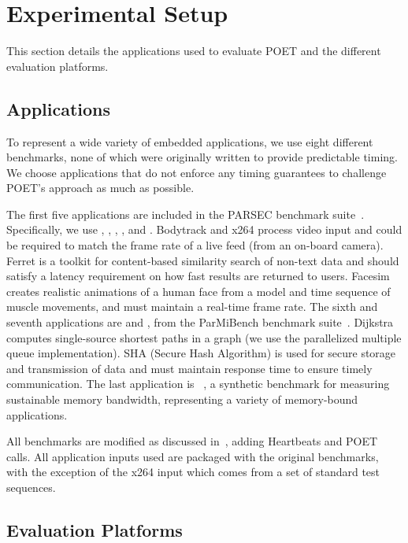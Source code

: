\section{Experimental Setup}
\label{sec:poet-usage}

This section details the applications used to evaluate POET and the different evaluation platforms.


\subsection{Applications}

To represent a wide variety of embedded applications, we use eight different benchmarks, none of which were originally written to provide predictable timing.
We choose applications that do not enforce any timing guarantees to challenge POET's approach as much as possible.

The first five applications are included in the PARSEC benchmark suite~\cite{parsec}.
Specifically, we use , , , , and .
Bodytrack and x264 process video input and could be required to match the frame rate of a live feed (\eg from an on-board camera).
Ferret is a toolkit for content-based similarity search of non-text data and should satisfy a latency requirement on how fast results are returned to users.
Facesim creates realistic animations of a human face from a model and time sequence of muscle movements, and must maintain a real-time frame rate.
The sixth and seventh applications are  and , from the ParMiBench benchmark suite~\cite{parmibench}.
Dijkstra computes single-source shortest paths in a graph (we use the parallelized multiple queue implementation).
SHA (Secure Hash Algorithm) is used for secure storage and transmission of data and must maintain response time to ensure timely communication.
The last application is ~\cite{stream}, a synthetic benchmark for measuring sustainable memory bandwidth, representing a variety of memory-bound applications.

All benchmarks are modified as discussed in~, adding Heartbeats and POET calls.
All application inputs used are packaged with the original benchmarks, with the exception of the x264 input which comes from a set of standard test sequences.


\subsection{Evaluation Platforms}


